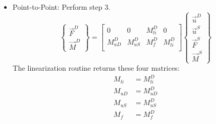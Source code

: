 \documentclass[10pt,letterpaper,oneside,notitlepage]{article}
\begin{document}
\begin{itemize}
   
  \item Point-to-Point: Perform step 3.
            \begin{equation}
            \left\{   \begin{matrix} \vec{F}^{D} \\ \vec{M}^{D} \end{matrix} \right\} 
         =
            \begin{bmatrix}
            0                    & 0                     & M_{li}^{D} & 0          \\
            M_{uD}^{D}           & M_{uS}^{D}            & M_{f}^{D}  & M_{li}^{D} \\
            \end{bmatrix}
            \left\{   \begin{matrix} \vec{u}^D \\ \vec{u}^{S}  \\ \vec{F}^{S}  \\ \vec{M}^{S} \end{matrix} \right\} 
         \end{equation}      
   The linearization routine returns these four matrices:
   \begin{align} M_{li} &= M_{li}^D \\ 
    M_{uD} &= M_{uD}^D \\ 
    M_{uS} &= M_{uS}^D \\ 
    M_{f}  &= M_{f}^D  \end{align} 
   
\end{itemize}
\end{document}
